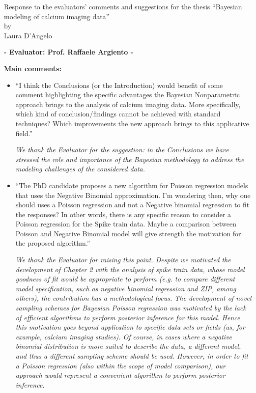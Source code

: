 \documentclass[11pt]{letter}
\begin{document}
\begin{center}
	{\large \sc Response to the evaluators' comments and suggestions for the thesis} \newline ``Bayesian modeling of calcium imaging data'' \\
	{\sc by} \\
	Laura D'Angelo
	\vspace*{1cm}
\end{center}

\begin{center}
{\large\bf - Evaluator: Prof. Raffaele Argiento -}
\end{center}

{\bf Main comments:}
%
\begin{itemize}
	
%
\item ``I think the Conclusions (or the Introduction) would benefit of some comment highlighting the specific advantages the Bayesian Nonparametric approach brings to the analysis of calcium imaging data. More specifically, which kind of conclusion/findings cannot be achieved with standard techniques? Which
improvements the new approach brings to this applicative field.''\vskip1mm

{\em 
	We thank the Evaluator for the suggestion: in the Conclusions we have stressed the role and importance of the Bayesian methodology to address the modeling challenges of the considered data.
	}
\vskip3mm

%
\item ``The PhD candidate proposes a new algorithm for Poisson regression models that uses the Negative Binomial approximation. I'm wondering then, why one should uses a Poisson regression and not a Negative binomial regression to fit the responses?
In other words, there is any specific reason to consider a Poisson regression for the Spike train data. Maybe a comparison between Poisson and Negative Binomial model will give strength the motivation for the proposed algorithm.''
\vskip1mm

{\em 
	We thank the Evaluator for raising this point. Despite we motivated the development of Chapter 2 with the analysis of spike train data, whose model goodness of fit would be appropriate to perform (e.g. to compare different model specification, such as negative binomial regression and ZIP, among others), the contribution has a methodological focus. The development of novel sampling schemes for Bayesian Poisson regression was motivated by the lack of efficient algorithms to perform posterior inference for this model. Hence this motivation goes beyond application to specific data sets or fields (as, for example, calcium imaging studies). Of course, in cases where a negative binomial distribution is more suited to describe the data, a different model, and thus a different sampling scheme should be used. However, in order to fit a Poisson regression (also within the scope of model comparison), our approach would represent a convenient algorithm to perform posterior inference.
}
\vskip3mm


\end{itemize}
\end{document}
